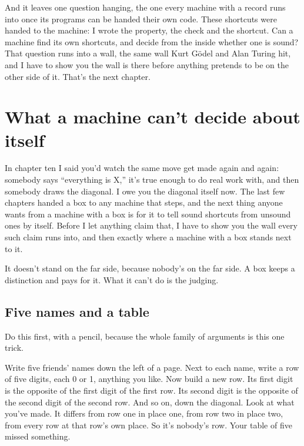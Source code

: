\documentclass[11pt,twoside]{article}
\theoremstyle{thielethm}
\theoremstyle{thieledef}
\theoremstyle{thieledef}
\theoremstyle{thieledef}
\theoremstyle{thielethm}
\theoremstyle{thieleobs}
\theoremstyle{thielethm}
\begin{document}
And it leaves one question hanging, the one every machine with a record runs into once its programs can be handed their own code. These shortcuts were handed to the machine: I wrote the property, the check and the shortcut. Can a machine find its own shortcuts, and decide from the inside whether one is sound? That question runs into a wall, the same wall Kurt Gödel and Alan Turing hit, and I have to show you the wall is there before anything pretends to be on the other side of it. That's the next chapter.

\section{What a machine can't decide about itself}
\label{sec:diagonal}

In chapter ten I said you'd watch the same move get made again and again: somebody says ``everything is X,'' it's true enough to do real work with, and then somebody draws the diagonal. I owe you the diagonal itself now. The last few chapters handed a box to any machine that steps, and the next thing anyone wants from a machine with a box is for it to tell sound shortcuts from unsound ones by itself. Before I let anything claim that, I have to show you the wall every such claim runs into, and then exactly where a machine with a box stands next to it.

It doesn't stand on the far side, because nobody's on the far side. A box keeps a distinction and pays for it. What it can't do is the judging.

\subsection{Five names and a table}

Do this first, with a pencil, because the whole family of arguments is this one trick.

Write five friends' names down the left of a page. Next to each name, write a row of five digits, each 0 or 1, anything you like. Now build a new row. Its first digit is the opposite of the first digit of the first row. Its second digit is the opposite of the second digit of the second row. And so on, down the diagonal. Look at what you've made. It differs from row one in place one, from row two in place two, from every row at that row's own place. So it's nobody's row. Your table of five missed something.
\end{document}
